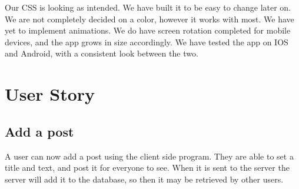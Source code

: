 \documentclass[12pt]{article}
\begin{document}
Our CSS is looking as intended. We have built it to be easy to change later on.
We are not completely decided on a color, however it works with most. We have
yet to implement animations. We do have screen rotation completed for mobile
devices, and the app grows in size accordingly. We have tested the app on IOS
and Android, with a consistent look between the two.

\section{User Story}

\subsection{Add a post}

A user can now add a post using the client side program.  They are able to set a 
title and text, and post it for everyone to see.  When it is sent to the server 
the server will add it to the database, so then it may be retrieved by other users.
\end{document}
